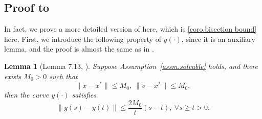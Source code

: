 \documentclass{article}
\newtheorem{lemma}[theorem]{Lemma}
\numberwithin{equation}{section}
\numberwithin{equation}{section}
\begin{document}
\subsection*{Proof to }
In fact, we prove a more detailed version of  here, which is \cref{coro.bisection bound} here. First, we introduce the following property of $y(\cdot)$, since it is an auxiliary lemma, and the proof is almost the same as in \citet{monteiro2013accelerated}.
\begin{lemma}[Lemma 7.13, \citet{monteiro2013accelerated}]
    \label{lem.curve condition}
    Suppose Assumption~\ref{assm.solvable} holds, and there exists $M_0>0$ such that
    \begin{equation}\label{eq.bounded assm point}
        \|x-x^*\|\leq M_0, \ \|v-x^*\|\leq M_0,
    \end{equation}
    then the curve $y(\cdot)$ satisfies
    \begin{equation}
        \label{eq.curve condition}
        \|y(s)-y(t)\| \leq \frac{2M_0}{t}(s-t), \ \forall s\geq t >0.
    \end{equation}
\end{lemma}
\end{document}
